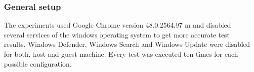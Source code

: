 \subsubsection{General setup}
The experiments used Google Chrome version 48.0.2564.97 m and disabled several services of the windows operating system to get more accurate test results. Windows Defender, Windows Search and Windows Update were disabled for both, host and guest machine. Every test was executed ten times for each possible configuration.

